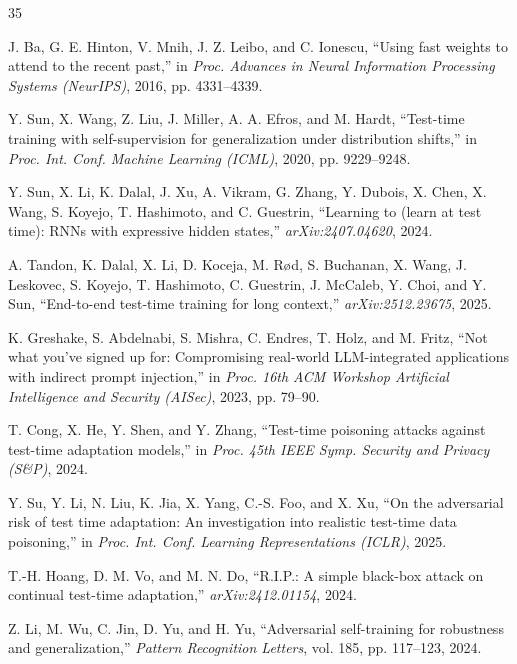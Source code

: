 \documentclass[journal]{IEEEtran}
\begin{document}
\begin{thebibliography}{35}

J. Ba, G. E. Hinton, V. Mnih, J. Z. Leibo, and C. Ionescu, ``Using fast weights to
attend to the recent past,'' in \emph{Proc. Advances in Neural Information Processing
Systems (NeurIPS)}, 2016, pp. 4331--4339.

Y. Sun, X. Wang, Z. Liu, J. Miller, A. A. Efros, and M. Hardt, ``Test-time training
with self-supervision for generalization under distribution shifts,'' in \emph{Proc.
Int. Conf. Machine Learning (ICML)}, 2020, pp. 9229--9248.

Y. Sun, X. Li, K. Dalal, J. Xu, A. Vikram, G. Zhang, Y. Dubois, X. Chen, X. Wang,
S. Koyejo, T. Hashimoto, and C. Guestrin, ``Learning to (learn at test time): RNNs
with expressive hidden states,'' \emph{arXiv:2407.04620}, 2024.

A. Tandon, K. Dalal, X. Li, D. Koceja, M. R\o{}d, S. Buchanan, X. Wang,
J. Leskovec, S. Koyejo, T. Hashimoto, C. Guestrin, J. McCaleb, Y. Choi, and Y. Sun,
``End-to-end test-time training for long context,'' \emph{arXiv:2512.23675}, 2025.

K. Greshake, S. Abdelnabi, S. Mishra, C. Endres, T. Holz, and M. Fritz, ``Not what
you've signed up for: Compromising real-world LLM-integrated applications with
indirect prompt injection,'' in \emph{Proc. 16th ACM Workshop Artificial Intelligence
and Security (AISec)}, 2023, pp. 79--90.

T. Cong, X. He, Y. Shen, and Y. Zhang, ``Test-time poisoning attacks against
test-time adaptation models,'' in \emph{Proc. 45th IEEE Symp. Security and Privacy
(S\&P)}, 2024.

Y. Su, Y. Li, N. Liu, K. Jia, X. Yang, C.-S. Foo, and X. Xu, ``On the adversarial
risk of test time adaptation: An investigation into realistic test-time data
poisoning,'' in \emph{Proc. Int. Conf. Learning Representations (ICLR)}, 2025.

T.-H. Hoang, D. M. Vo, and M. N. Do, ``R.I.P.: A simple black-box attack on
continual test-time adaptation,'' \emph{arXiv:2412.01154}, 2024.

Z. Li, M. Wu, C. Jin, D. Yu, and H. Yu, ``Adversarial self-training for robustness
and generalization,'' \emph{Pattern Recognition Letters}, vol. 185, pp. 117--123,
2024.


\end{thebibliography}
\end{document}
